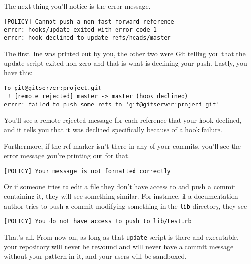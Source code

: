 \documentclass[a4paper]{book}
\newcounter{tab}[chapter]
\begin{document}
The next thing you'll notice is the error message.

\begin{shaded}\begin{verbatim}
[POLICY] Cannot push a non fast-forward reference
error: hooks/update exited with error code 1
error: hook declined to update refs/heads/master
\end{verbatim}\end{shaded}

The first line was printed out by you, the other two were Git telling you that the update script exited non-zero and that is what is declining your push. Lastly, you have this:

\begin{shaded}\begin{verbatim}
To git@gitserver:project.git
 ! [remote rejected] master -> master (hook declined)
error: failed to push some refs to 'git@gitserver:project.git'
\end{verbatim}\end{shaded}

You'll see a remote rejected message for each reference that your hook declined, and it tells you that it was declined specifically because of a hook failure.

Furthermore, if the ref marker isn't there in any of your commits, you'll see the error message you're printing out for that.

\begin{shaded}\begin{verbatim}
[POLICY] Your message is not formatted correctly
\end{verbatim}\end{shaded}

Or if someone tries to edit a file they don't have access to and push a commit containing it, they will see something similar. For instance, if a documentation author tries to push a commit modifying something in the \texttt{lib} directory, they see

\begin{shaded}\begin{verbatim}
[POLICY] You do not have access to push to lib/test.rb
\end{verbatim}\end{shaded}

That's all. From now on, as long as that \texttt{update} script is there and executable, your repository will never be rewound and will never have a commit message without your pattern in it, and your users will be sandboxed.
\end{document}
